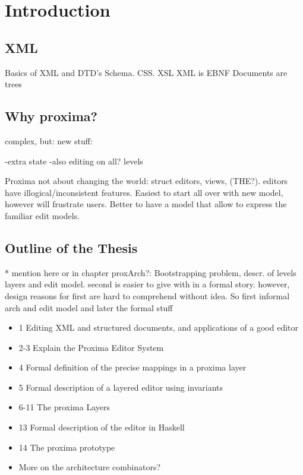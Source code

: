 \chapter{Introduction}
\label{chap:introduction}

\section{XML}
Basics of XML and DTD's  Schema. CSS. XSL
XML is EBNF 
Documents are trees


\section{Why proxima?}

complex, but:
new stuff:

-extra state
-also editing on all? levels

Proxima not about changing the world: struct editors, views, (THE?). editors have illogical/inconsistent features. Easiest to start all over with new model, however will frustrate users. Better to have a model that allow to express the familiar edit models.

\section{Outline of the Thesis}
* mention here or in chapter proxArch?:
Bootstrapping problem, descr. of levels layers and edit model. second is easier to give with in a formal story. however, design reasons for first are hard to comprehend without idea. So first informal arch and edit model and later the formal stuff

\begin{itemize}
\item 1 Editing XML and structured documents, and applications of a good editor
\item 2-3 Explain the Proxima Editor System
\item 4 Formal definition of the precise mappings in a proxima layer
\item 5 Formal description of a layered editor using invariants
\item 6-11 The proxima Layers 



\item 13 Formal description of the editor in Haskell
\item 14 The proxima prototype
\item More on the architecture combinators?

\end{itemize}